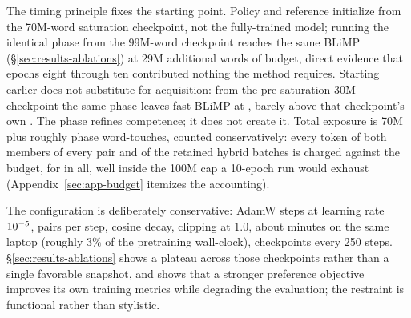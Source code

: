 The timing principle fixes the starting point. Policy and reference
initialize from the 70M-word saturation checkpoint, not the fully-trained
model; running the identical phase from the 99M-word checkpoint reaches the
same BLiMP (\S\ref{sec:results-ablations}) at 29M additional words of
budget, direct evidence that epochs eight through ten contributed nothing
the method requires. Starting earlier does not substitute for acquisition:
from the
pre-saturation 30M checkpoint the same phase leaves fast BLiMP at
\rInitThirtyB{}, barely above that checkpoint's own \rThirtyBaseB{}. The
phase refines competence; it does not create it. Total exposure is 70M plus roughly \rDpoPhaseWords{} phase
word-touches, counted conservatively: every token of both members of every
pair and of the retained hybrid batches is charged against the budget, for
\rDpoWords{} in all, well inside the 100M cap a 10-epoch run would exhaust
(Appendix~\ref{sec:app-budget} itemizes the accounting).

The configuration is deliberately conservative: \rDpoSteps{} AdamW steps at
learning rate $10^{-5}$, \rDpoPairs{} pairs per step, cosine decay,
clipping at $1.0$, about \rDpoMinutes{} minutes on the same laptop (roughly
$3\%$ of the pretraining wall-clock), checkpoints every 250 steps.
\S\ref{sec:results-ablations} shows a plateau across those checkpoints
rather than a single favorable snapshot, and shows that a stronger
preference objective improves its own training metrics while degrading the
evaluation; the restraint is functional rather than stylistic.
